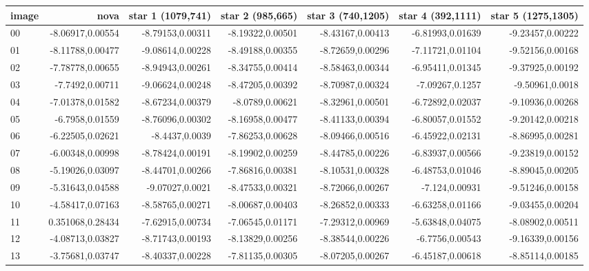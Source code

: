 \documentclass{article}
\begin{document}
\begin{enumerate}
		\begin{table} [h]
			\centering
			\begin{tabular} {l r r r r r r}
				\toprule
				\textbf{image} & \textbf{nova} & \textbf{star 1 (1079,741)} & \textbf{star 2 (985,665)} & \textbf{star 3 (740,1205)} & \textbf{star 4 (392,1111)} & \textbf{star 5 (1275,1305)} \\
				\midrule
				00 & -8.06917,0.00554 & -8.79153,0.00311 & -8.19322,0.00501 & -8.43167,0.00413 & -6.81993,0.01639 & -9.23457,0.00222 \\
				01 & -8.11788,0.00477 & -9.08614,0.00228 & -8.49188,0.00355 & -8.72659,0.00296 & -7.11721,0.01104 & -9.52156,0.00168 \\
				02 & -7.78778,0.00655 & -8.94943,0.00261 & -8.34755,0.00414 & -8.58463,0.00344 & -6.95411,0.01345 & -9.37925,0.00192 \\
				03 & -7.7492,0.00711 & -9.06624,0.00248 & -8.47205,0.00392 & -8.70987,0.00324 & -7.09267,0.1257 & -9.50961,0.0018 \\
				04 & -7.01378,0.01582 & -8.67234,0.00379 & -8.0789,0.00621 & -8.32961,0.00501 & -6.72892,0.02037 & -9.10936,0.00268 \\
				05 & -6.7958,0.01559 & -8.76096,0.00302 & -8.16958,0.00477 & -8.41133,0.00394 & -6.80057,0.01552 & -9.20142,0.00218 \\
				06 & -6.22505,0.02621 & -8.4437,0.0039 & -7.86253,0.00628 & -8.09466,0.00516 & -6.45922,0.02131 & -8.86995,0.00281 \\
				07 & -6.00348,0.00998 & -8.78424,0.00191 & -8.19902,0.00259 & -8.44785,0.00226 & -6.83937,0.00566 & -9.23819,0.00152 \\
				08 & -5.19026,0.03097 & -8.44701,0.00266 & -7.86816,0.00381 & -8.10531,0.00328 & -6.48753,0.01046 & -8.89045,0.00205 \\
				09 & -5.31643,0.04588 & -9.07027,0.0021 & -8.47533,0.00321 & -8.72066,0.00267 & -7.124,0.00931 & -9.51246,0.00158 \\
				10 & -4.58417,0.07163 & -8.58765,0.00271 & -8.00687,0.00403 & -8.26852,0.00333 & -6.63258,0.01166 & -9.03455,0.00204 \\
				11 & 0.351068,0.28434 & -7.62915,0.00734 & -7.06545,0.01171 & -7.29312,0.00969 & -5.63848,0.04075 & -8.08902,0.00511 \\
				12 & -4.08713,0.03827 & -8.71743,0.00193 & -8.13829,0.00256 & -8.38544,0.00226 & -6.7756,0.00543 & -9.16339,0.00156 \\
				13 & -3.75681,0.03747 & -8.40337,0.00228 & -7.81135,0.00305 & -8.07205,0.00267 & -6.45187,0.00618 & -8.85114,0.00185 \\

\end{tabular}
\end{table}
\end{enumerate}
\end{document}
